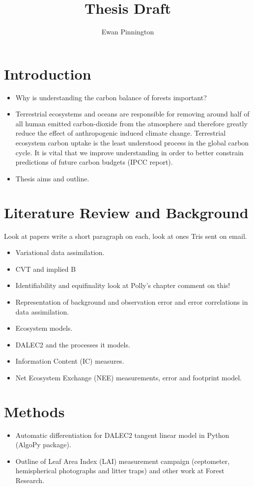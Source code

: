 \documentclass[11pt]{article}
\title{Thesis Draft}
\author{Ewan Pinnington}
\begin{document}
\maketitle

\section{Introduction}
\begin{itemize}
\item Why is understanding the carbon balance of forests important?
\item Terrestrial ecosystems and oceans are responsible for removing around half of all human emitted carbon-dioxide from the atmosphere and therefore greatly reduce the effect of anthropogenic induced climate change. Terrestrial ecosystem carbon uptake is the least understood process in the global carbon cycle. It is vital that we improve understanding in order to better constrain predictions of future carbon budgets (IPCC report).
\item Thesis aims and outline.
\end{itemize}


\section{Literature Review and Background}
Look at papers write a short paragraph on each, look at ones Tris sent on email.
\begin{itemize}
\item Variational data assimilation.
\item CVT and implied B
\item Identifiability and equifinality look at Polly's chapter comment on this!
\item Representation of background and observation error and error correlations in data assimilation.
\item Ecosystem models.
\item DALEC2 and the processes it models.
\item Information Content (IC) measures.
\item Net Ecosystem Exchange (NEE) measurements, error and footprint model.
\end{itemize}


\section{Methods}
\begin{itemize}
\item Automatic differentiation for DALEC2 tangent linear model in Python (AlgoPy package).
\item Outline of Leaf Area Index (LAI) measurement campaign (ceptometer, hemispherical photographs and litter traps) and other work at Forest Research.
\end{itemize}
\end{document}
